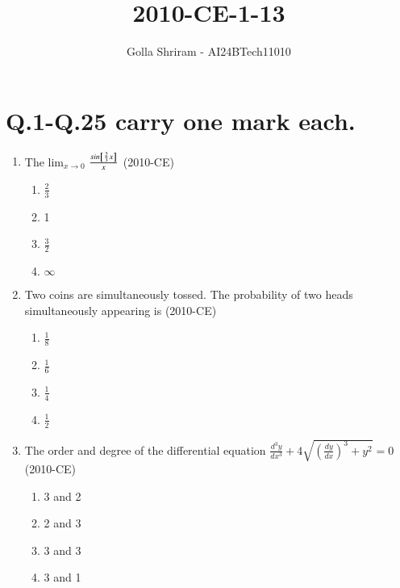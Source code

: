 \documentclass[journal,12pt,twocolumn]{IEEEtran}
\theoremstyle{remark}
\begin{document}

\onecolumn
\vspace{3cm}
\title{ 2010-CE-1-13 }
\author{Golla Shriram - AI24BTech11010}

\maketitle

\renewcommand{\thefigure}{\theenumi}
\renewcommand{\thetable}{\theenumi}

\section{ Q.1-Q.25 carry one mark each. }
                                                                           
 \begin{enumerate}
		 
	 \item The {lim}$_{x \rightarrow 0}$ $\frac{sin{  {}\left[\frac{2}{3} x\right]}}{x}$ \hfill{(2010-CE)}

\begin{enumerate}
	\item $\frac{2}{3}$
	\item 1
	\item $\frac{3}{2}$
	\item $\infty$

\end{enumerate}


\item Two coins are simultaneously tossed. The probability of two heads simultaneously appearing is \hfill{(2010-CE)}

		\begin{enumerate}
		\item $\frac{1}{8}$ 

	\item $\frac{1}{6} $

	\item $\frac{1}{4} $

	\item $\frac{1}{2}$ 
		\end{enumerate}

\item The order and degree of the differential equation $\frac{d^{3}y}{dx^3} + 4 \sqrt{ (\frac{dy}{dx})^{3} +y^2}  =  0$ \hfill{(2010-CE)}

	\begin{enumerate}
\item 3 and 2
\item 2 and 3
\item 3 and 3
\item 3 and 1
	\end{enumerate}



\end{enumerate}
\end{document}
